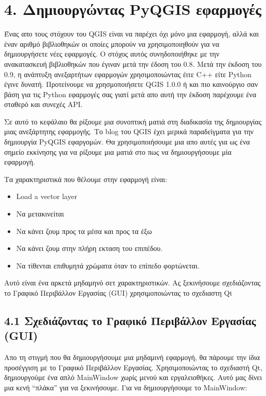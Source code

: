 
\section{4. Δημιουργώντας PyQGIS εφαρμογές}


Ένας απο τους στόχουν του QGIS είναι να παρέχει όχι μόνο μια εφαρμογή, αλλά και έναν αριθμό βιβλιοθηκών οι οποίες μπορούν να χρησιμοποιηθούν για να δημιουργήσετε νέες εφαρμογές. Ο στόχος αυτός συνηδοποιήθηκε με την ανακατασκευή βιβλιοθηκών που έγιναν μετά την έδοση του 0.8. Μετά την έκδοση του 0.9, η ανάπτυξη ανεξαρτήτων εφαρμογών χρησιμοποιώντας έιτε C++ είτε Python έγινε δυνατή. Προτείνουμε να χρησμοποιήσετε QGIS 1.0.0 ή και πιο καινούργιο σαν βάση για τις Python εφαρμογές σας γιατί μετά απο αυτή την έκδοση παρέχουμε ένα σταθερό και συνεχές API. 

Σε αυτό το κεφάλαιο θα ρίξουμε μια συνοπτική ματιά στη διαδικασία της δημιουργίας μιας ανεξάρτητης εφαρμογής. Το blog του QGIS έχει μερικά παραδείγματα για την δημιουργία PyQGIS εφαργομών. Θα χρησιμοποιήσουμε μια απο αυτές για ως ένα σημείο εκκίνησης για να ρίξουμε μια ματιά στο πως να δημιουργήσουμε μία εφαρμογή. 

Τα χαρακτηριστικά που θέλουμε στην εφαρμογή είναι: 

\begin{itemize}
\item Load a vector layer
\item Να μετακινείται
\item Να κάνει ζουμ προς τα μέσα και προς τα έξω
\item Να κάνει ζουμ στην πλήρη εκταση του επιπέδου.
\item Να τίθενται επιθυμητά χρώματα όταν το επίπεδο φορτώνεται.
\end{itemize} 

Αυτό είναι ένα αρκετά μηδαμηνό σετ χαρακτηριστικών. Ας ξεκινήσουμε σχεδιάζοντας το Γραφικό Περιβάλλον Εργασίας (GUI) χρησιμοποιώντας το σχεδιαστη Qt 

\subsection{4.1 Σχεδιάζοντας το Γραφικό Περιβάλλον Εργασίας (GUI)}

Απο τη στιγμή που θα δημιουργήσουμε μια μηδαμινή εφαρμογή, θα πάρουμε την ίδια προσέγγιση με το Γραφικό Περιβάλλον Εργασίας. Χρησιμοποιώντας το σχεδιαστή Qt, δημιουργούμε ένα απλό MainWindow χωρίς μενού και εργαλειοθήκες. Αυτό μας δίνει μια κενή “πλάκα” για να ξεκινήσουμε. Για να δημιουργήσουμε το MainWindow:

